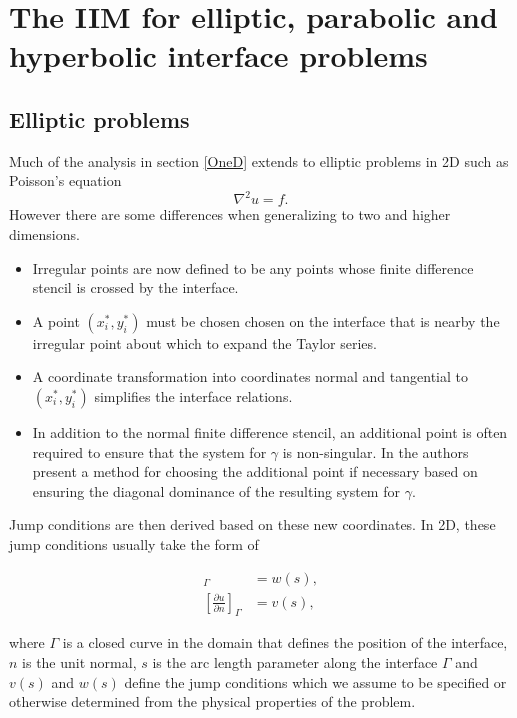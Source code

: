 \section{The IIM for elliptic, parabolic and hyperbolic interface problems}
\subsection{Elliptic problems}
\label{ellipticProblems}

Much of the analysis in section \ref{OneD} extends to elliptic problems in 2D such as Poisson's equation
\begin{equation}
    \nabla^2 u = f.
\end{equation}
However there are some differences when generalizing to two and higher dimensions.
\begin{itemize}
    \item Irregular points are now defined to be any points whose finite difference stencil is crossed by the interface.
    \item A point $(x_{i}^*,y_{i}^*)$ must be chosen chosen on the interface that is nearby the irregular point about which to expand the Taylor series.
    \item A coordinate transformation into coordinates normal and tangential to $(x_{i}^*,y_{i}^*)$ simplifies the interface relations.
    \item In addition to the normal finite difference stencil, an additional point is often required to ensure that the system for $\gamma$ is non-singular. In \cite{fogelsonkeener00} the authors present a method for choosing the additional point if necessary based on ensuring the diagonal dominance of the resulting system for $\gamma$.
\end{itemize}

Jump conditions are then derived based on these new coordinates.
In 2D, these jump conditions usually take the form of

\begin{align}
    [u]_\Gamma & =  w(s), \\ \nonumber
    \left[\frac{\partial u}{\partial n}\right]_\Gamma & = v(s) ,
\end{align}

where $\Gamma$ is a closed curve in the domain that defines the position of the interface, $n$ is the unit normal, $s$ is the arc length parameter along the interface $\Gamma$ and $v(s)$ and $w(s)$ define the jump conditions which we assume to be specified or otherwise determined from the physical properties of the problem.

